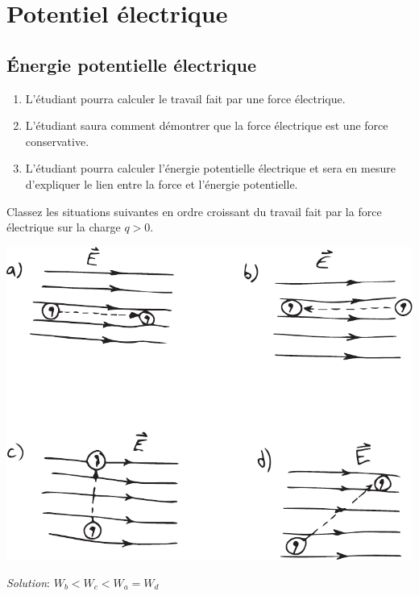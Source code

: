 \chapter{Potentiel électrique}


\section{Énergie potentielle électrique}



\begin{enumerate}
  \item L'étudiant pourra calculer le travail fait par une force électrique.
  \item L'étudiant saura comment démontrer que la force électrique est une
    force conservative.
  \item L'étudiant pourra calculer l'énergie potentielle électrique et sera en
    mesure d'expliquer le lien entre la force et l'énergie potentielle.
\end{enumerate}



\begin{diapobox}

Classez les situations suivantes en ordre croissant du travail fait par la
force électrique sur la charge $q > 0$.

\begin{center}
  \includegraphics[scale=0.7]{04-potentiel/figures/travail-force-electrique.pdf}
\end{center}

\textit{Solution}: $W_b < W_c < W_a = W_d$
\end{diapobox}


